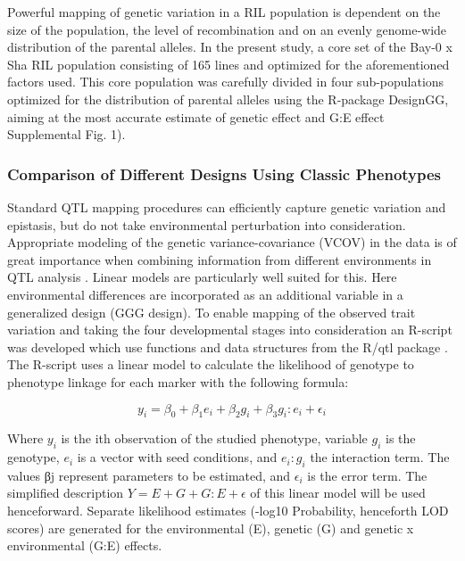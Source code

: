 Powerful mapping of genetic variation in a RIL population is dependent on the size of the population, the level 
of recombination and on an evenly genome-wide distribution of the parental alleles. In the present study, a core 
set of the Bay-0 x Sha RIL population \cite{Loudet:2002} consisting of 165 lines and optimized for the 
aforementioned factors used. This core population was carefully divided in four sub-populations optimized for 
the distribution of parental alleles using the R-package DesignGG, aiming at the most accurate estimate of genetic 
effect and G:E effect \cite{Li:2009} Supplemental Fig. 1).

\subsubsection{Comparison of Different Designs Using Classic Phenotypes}
Standard QTL mapping procedures can efficiently capture genetic variation and epistasis, but do not take 
environmental perturbation into consideration. Appropriate modeling of the genetic variance-covariance (VCOV) 
in the data is of great importance when combining information from different environments in QTL analysis 
\cite{Churchill:2002}. Linear models are particularly well suited for this. Here environmental differences are 
incorporated as an additional variable in a generalized design (GGG design). To enable mapping of the observed 
trait variation and taking the four developmental stages into consideration an R-script was developed which use 
functions and data structures from the R/qtl package \cite{Broman:2003, Arends:2010}.
The R-script uses a linear model to calculate the likelihood of genotype to phenotype linkage for each marker 
with the following formula:

$$ y_{i}   =   \beta_{0} + \beta_{1}e_{i} + \beta_{2}g_{i} + \beta_{3}g_{i}:e_{i} + \epsilon_{i} $$

Where $y_{i}$ is the ith observation of the studied phenotype, variable $g_{i}$ is the genotype, $e_{i}$ is a vector with seed 
conditions, and $e_{i}:g_{i}$ the interaction term. The values βj represent parameters to be estimated, and $\epsilon_{i}$ is the 
error term. The simplified description $Y = E + G + G:E + \epsilon$ of this linear model will be used henceforward. Separate 
likelihood estimates (-log10 Probability, henceforth LOD scores) are generated for the environmental (E), genetic 
(G) and genetic x environmental (G:E) effects. 

